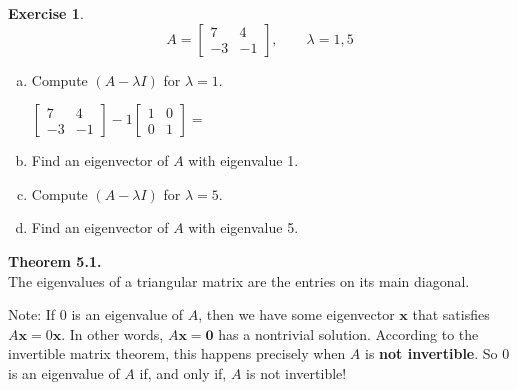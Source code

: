 \documentclass[10pt]{book}
\newcommand{\boxcolor}{gray!30}
\newenvironment{boxme}{\begin{mdframed}[backgroundcolor=\boxcolor,linewidth=0pt,nobreak=true]}{\end{mdframed}}
\newenvironment{boxthm}{\begin{mdframed}[backgroundcolor=\boxcolor,nobreak=true]}{\end{mdframed}}
\theoremstyle{definition}
\newtheorem{exercise}{Exercise}[section]
\newcommand{\vect}[1]{\ensuremath{\boldsymbol{\mathbf{#1}}}}
\newcommand{\Axz}{A\vect{x}=\vect{0}}
\begin{document}
\begin{exercise} %
	$$ A = \begin{bmatrix}7&4\\-3&-1\end{bmatrix}, \qquad \lambda = 1,5 $$
	\begin{multicols}{2}
		\begin{enumerate}[(a)]
			\item Compute $(A-\lambda I)$ for $\lambda=1$.
			
			$\begin{bmatrix}7&4\\-3&-1\end{bmatrix}-1\begin{bmatrix}1&0\\0&1\end{bmatrix}=$
			\vspace{2em}
			\item Find an eigenvector of $A$ with eigenvalue 1.
			\columnbreak
			\item Compute $(A-\lambda I)$ for $\lambda=5$.
			
			\phantom{$\begin{bmatrix}7&4\\-3&-1\end{bmatrix}-5\begin{bmatrix}1&0\\0&1\end{bmatrix}=$}
			\vspace{2em}
			\item Find an eigenvector of $A$ with eigenvalue 5.
		\end{enumerate}
	\end{multicols}
\end{exercise}
\vfill


\newpage


\begin{boxthm}
	\textbf{Theorem 5.1.} \\
	The eigenvalues of a triangular matrix are the entries on its main diagonal.
\end{boxthm}
\vspace{-1em}

\begin{boxme}
	Note: If 0 is an eigenvalue of $A$, then we have some eigenvector $\vect{x}$ that satisfies $A\vect{x}=0\vect{x}$. In other words, $\Axz$ has a nontrivial solution. According to the invertible matrix theorem, this happens precisely when $A$ is \textbf{not invertible}. So 0 is an eigenvalue of $A$ if, and only if, $A$ is not invertible!
\end{boxme}
\end{document}
